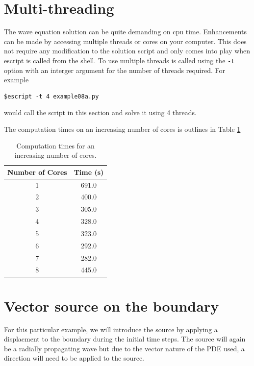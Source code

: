 \section{Multi-threading}
The wave equation solution can be quite demanding on cpu time. Enhancements can
be made by accessing multiple threads or cores on your computer. This does not
require any modification to the solution script and only comes into play when
escript is called from the shell. To use multiple threads \esc is called using
the \verb!-t! option with an interger argument for the number of threads
required. For example
\begin{verbatim}
$escript -t 4 example08a.py
\end{verbatim}
would call the script in this section and solve it using 4 threads.

The computation times on an increasing number of cores is outlines in Table
\ref{tab:wpcores}

\begin{table}[ht]
\begin{center}
\caption{Computation times for an increasing number of cores.}
\label{tab:wpcores}
\begin{tabular}{| c | c |}
\hline
Number of Cores & Time (s) \\
\hline
1 & 691.0 \\
2 & 400.0 \\
3 & 305.0 \\
4 & 328.0 \\
5 & 323.0 \\
6 & 292.0 \\
7 & 282.0 \\
8 & 445.0 \\ \hline
\end{tabular}
\end{center}
\end{table}

\section{Vector source on the boundary}
For this particular example, we will introduce the source by applying a
displacment to the boundary during the initial time steps. The source will again
be
a radially propagating wave but due to the vector nature of the PDE used, a
direction will need to be applied to the source.


